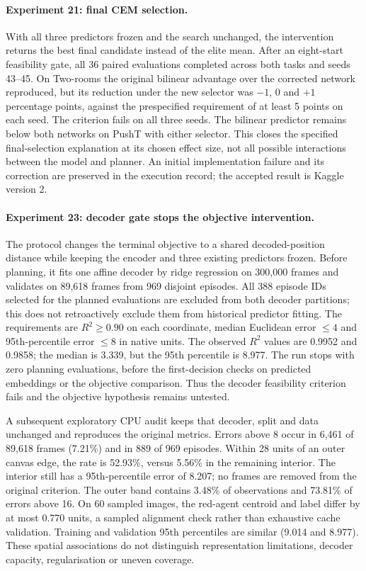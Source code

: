 \documentclass[11pt,a4paper]{article}
\begin{document}
\paragraph{Experiment 21: final CEM selection.} With all three predictors frozen and the search unchanged, the intervention returns the best final candidate instead of the elite mean. After an eight-start feasibility gate, all 36 paired evaluations completed across both tasks and seeds 43--45. On Two-rooms the original bilinear advantage over the corrected network reproduced, but its reduction under the new selector was $-1$, $0$ and $+1$ percentage points, against the prespecified requirement of at least 5 points on each seed. The criterion fails on all three seeds. The bilinear predictor remains below both networks on PushT with either selector. This closes the specified final-selection explanation at its chosen effect size, not all possible interactions between the model and planner. An initial implementation failure and its correction are preserved in the execution record; the accepted result is Kaggle version 2.

\paragraph{Experiment 23: decoder gate stops the objective intervention.} The protocol changes the terminal objective to a shared decoded-position distance while keeping the encoder and three existing predictors frozen. Before planning, it fits one affine decoder by ridge regression on 300,000 frames and validates on 89,618 frames from 969 disjoint episodes. All 388 episode IDs selected for the planned evaluations are excluded from both decoder partitions; this does not retroactively exclude them from historical predictor fitting. The requirements are $R^2\geq0.90$ on each coordinate, median Euclidean error $\leq4$ and 95th-percentile error $\leq8$ in native units. The observed $R^2$ values are 0.9952 and 0.9858; the median is 3.339, but the 95th percentile is 8.977. The run stops with zero planning evaluations, before the first-decision checks on predicted embeddings or the objective comparison. Thus the decoder feasibility criterion fails and the objective hypothesis remains untested.

A subsequent exploratory CPU audit keeps that decoder, split and data unchanged and reproduces the original metrics. Errors above 8 occur in 6,461 of 89,618 frames (7.21\%) and in 889 of 969 episodes. Within 28 units of an outer canvas edge, the rate is 52.93\%, versus 5.56\% in the remaining interior. The interior still has a 95th-percentile error of 8.207; no frames are removed from the original criterion. The outer band contains 3.48\% of observations and 73.81\% of errors above 16. On 60 sampled images, the red-agent centroid and label differ by at most 0.770 units, a sampled alignment check rather than exhaustive cache validation. Training and validation 95th percentiles are similar (9.014 and 8.977). These spatial associations do not distinguish representation limitations, decoder capacity, regularisation or uneven coverage.
\end{document}
